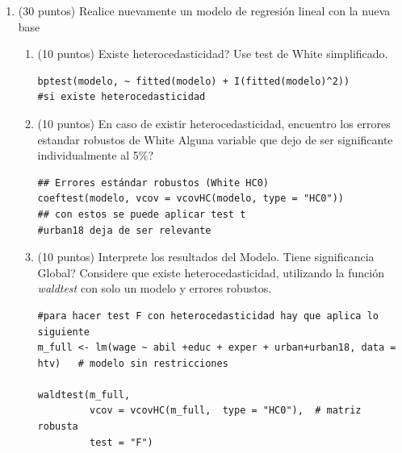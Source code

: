 \documentclass[letterpaper,11pt]{article}
\begin{document}
\begin{enumerate}
   \item (30 puntos) Realice nuevamente un modelo de regresión lineal con la nueva base 
    \begin{enumerate}
        \item  (10 puntos) \textquestiondown Existe heterocedasticidad? Use test de White simplificado.
\begin{lstlisting}
bptest(modelo, ~ fitted(modelo) + I(fitted(modelo)^2)) 
#si existe heterocedasticidad
\end{lstlisting}
        \item (10 puntos) En caso de existir heterocedasticidad, encuentro los errores estandar robustos de White \textquestiondown Alguna variable que dejo de ser significante individualmente al 5\%?
\begin{lstlisting}
## Errores estándar robustos (White HC0)
coeftest(modelo, vcov = vcovHC(modelo, type = "HC0"))
## con estos se puede aplicar test t
#urban18 deja de ser relevante
\end{lstlisting}
        \item (10 puntos) Interprete los resultados del Modelo. \textquestiondown Tiene significancia Global? Considere que existe heterocedasticidad, utilizando la función \textit{waldtest} con solo un modelo y errores robustos. 
 \begin{lstlisting}       
#para hacer test F con heterocedasticidad hay que aplica lo siguiente
m_full <- lm(wage ~ abil +educ + exper + urban+urban18, data = htv)   # modelo sin restricciones

waldtest(m_full,
         vcov = vcovHC(m_full,  type = "HC0"),  # matriz robusta
         test = "F")
\end{lstlisting}        
    \end{enumerate} 

\end{enumerate}
\end{document}
